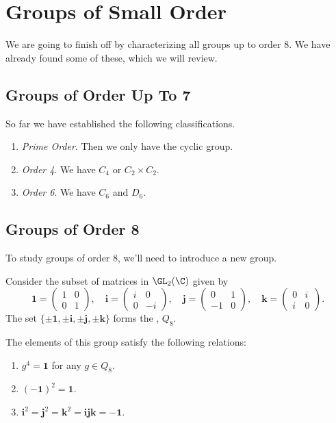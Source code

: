 \documentclass[a4]{scrreprt}
\newcommand{\newchapter}{\chapter}
\newcommand{\newsection}{\section}
\begin{document}
\newchapter{Groups of Small Order}

We are going to finish off by characterizing all groups up to order 8. We have already found some of these, which we will review.

\newsection{Groups of Order Up To 7}

So far we have established the following classifications.

\begin{enumerate}
	\item \emph{Prime Order}. Then we only have the cyclic group.
	\item \emph{Order 4}. We have $C_4$ or $C_2 \times C_2$.
	\item \emph{Order 6}. We have $C_6$ and $D_6$.
\end{enumerate}

\newsection{Groups of Order 8}

To study groups of order 8, we'll need to introduce a new group.

\begin{definition}[Quaternions]
	Consider the subset of matrices in $\GL_2(\C)$ given by
	$$
	\mathbf{1} = \begin{pmatrix}
		1 & 0 \\ 0 & 1
	\end{pmatrix}, \quad  \mathbf{i} = \begin{pmatrix}
		i & 0 \\ 0 & -i
	\end{pmatrix}, \quad \mathbf{j} = \begin{pmatrix}
		0 & 1 \\ -1 & 0
	\end{pmatrix}, \quad \mathbf{k} = \begin{pmatrix}
		0 & i \\ i & 0
	\end{pmatrix}.
	$$
	The set $\{\pm\mathbf{1}, \pm\mathbf{i}, \pm\mathbf{j}, \pm\mathbf{k}\}$ forms the , $Q_8$.
\end{definition}

The elements of this group satisfy the following relations:
\begin{enumerate}[label=(\roman*)]
	\item $g^4= \mathbf{1}$ for any $g \in Q_8$.
	\item $(-\mathbf{1})^2 = \mathbf{1}$.
	\item $\mathbf{i}^2 = \mathbf{j}^2 = \mathbf{k}^2 = \mathbf{ijk} = -\mathbf{1}$.
\end{enumerate}
\end{document}

